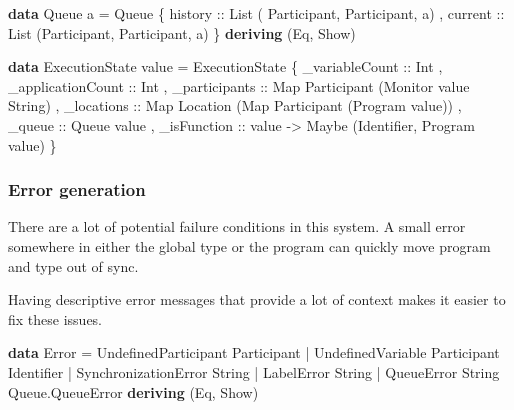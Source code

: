 \documentclass[runningheads]{llncs}
\newenvironment{Shaded}{}{}
\newcommand{\KeywordTok}[1]{\textcolor[rgb]{0.00,0.44,0.13}{\textbf{#1}}}
\newcommand{\DataTypeTok}[1]{\textcolor[rgb]{0.56,0.13,0.00}{#1}}
\newcommand{\OtherTok}[1]{\textcolor[rgb]{0.00,0.44,0.13}{#1}}
\newcommand{\FunctionTok}[1]{\textcolor[rgb]{0.02,0.16,0.49}{#1}}
\newcommand{\NormalTok}[1]{#1}
\begin{document}
\begin{Shaded}
\begin{Highlighting}[]
\KeywordTok{data} \DataTypeTok{Queue}\NormalTok{ a }\FunctionTok{=} \DataTypeTok{Queue} 
\NormalTok{    \{}\OtherTok{ history ::} \DataTypeTok{List}\NormalTok{ ( }\DataTypeTok{Participant}\NormalTok{, }\DataTypeTok{Participant}\NormalTok{, a)}
\NormalTok{    ,}\OtherTok{ current ::} \DataTypeTok{List}\NormalTok{ (}\DataTypeTok{Participant}\NormalTok{, }\DataTypeTok{Participant}\NormalTok{, a)}
\NormalTok{    \}}
    \KeywordTok{deriving}\NormalTok{ (}\DataTypeTok{Eq}\NormalTok{, }\DataTypeTok{Show}\NormalTok{)}

\KeywordTok{data} \DataTypeTok{ExecutionState}\NormalTok{ value }\FunctionTok{=} 
    \DataTypeTok{ExecutionState} 
\NormalTok{    \{}\OtherTok{ _variableCount ::} \DataTypeTok{Int}
\NormalTok{    ,}\OtherTok{ _applicationCount ::} \DataTypeTok{Int}
\NormalTok{    ,}\OtherTok{ _participants ::} \DataTypeTok{Map} \DataTypeTok{Participant}\NormalTok{ (}\DataTypeTok{Monitor}\NormalTok{ value }\DataTypeTok{String}\NormalTok{)}
\NormalTok{    ,}\OtherTok{ _locations ::} \DataTypeTok{Map} \DataTypeTok{Location}\NormalTok{ (}\DataTypeTok{Map} \DataTypeTok{Participant}\NormalTok{ (}\DataTypeTok{Program}\NormalTok{ value))}
\NormalTok{    ,}\OtherTok{ _queue ::} \DataTypeTok{Queue}\NormalTok{ value}
\NormalTok{    ,}\OtherTok{ _isFunction ::}\NormalTok{ value }\OtherTok{->} \DataTypeTok{Maybe}\NormalTok{ (}\DataTypeTok{Identifier}\NormalTok{, }\DataTypeTok{Program}\NormalTok{ value)}
\NormalTok{    \}}
\end{Highlighting}
\end{Shaded}

\subsubsection{Error generation}\label{error-generation}

There are a lot of potential failure conditions in this system. A small
error somewhere in either the global type or the program can quickly
move program and type out of sync.

Having descriptive error messages that provide a lot of context makes it
easier to fix these issues.

\begin{Shaded}
\begin{Highlighting}[]
\KeywordTok{data} \DataTypeTok{Error} 
    \FunctionTok{=} \DataTypeTok{UndefinedParticipant} \DataTypeTok{Participant}
    \FunctionTok{|} \DataTypeTok{UndefinedVariable} \DataTypeTok{Participant} \DataTypeTok{Identifier}
    \FunctionTok{|} \DataTypeTok{SynchronizationError} \DataTypeTok{String}
    \FunctionTok{|} \DataTypeTok{LabelError} \DataTypeTok{String}
    \FunctionTok{|} \DataTypeTok{QueueError} \DataTypeTok{String} \DataTypeTok{Queue.QueueError}
    \KeywordTok{deriving}\NormalTok{ (}\DataTypeTok{Eq}\NormalTok{, }\DataTypeTok{Show}\NormalTok{)}
\end{Highlighting}
\end{Shaded}
\end{document}
